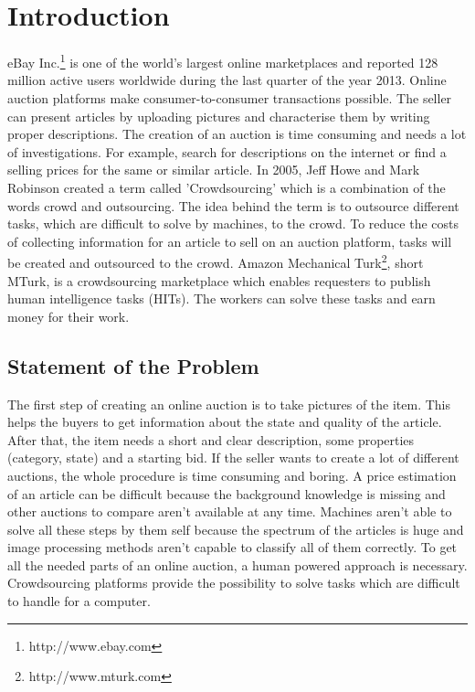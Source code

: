 \documentclass[a4paper]{report}
\begin{document}
  




%

\pagestyle{plain}
\newpage





\dominitoc
\tableofcontents
\newpage

\listoffigures

\listoftables

\lstlistoflistings

\chapter{Introduction}
\newpage
eBay Inc.\footnote{http://www.ebay.com} is one of the world's largest online marketplaces and reported 128 million active users worldwide during the last quarter of the year 2013. Online auction platforms make consumer-to-consumer transactions possible. The seller can present articles by uploading pictures and characterise them by writing proper descriptions. The creation of an auction is time consuming and needs a lot of investigations. For example, search for descriptions on the internet or find a selling prices for the same or similar article. In 2005, Jeff Howe and Mark Robinson created a term called 'Crowdsourcing' which is a combination of the words crowd and outsourcing. The idea behind the term is to outsource different tasks, which are difficult to solve by machines, to the crowd. To reduce the costs of collecting information for an article to sell on an auction platform, tasks will be created and outsourced to the crowd. Amazon Mechanical Turk\footnote{http://www.mturk.com}, short MTurk, is a crowdsourcing marketplace which enables requesters to publish human intelligence tasks (HITs). The workers can solve these tasks and earn money for their work.

\section{Statement of the Problem}
The first step of creating an online auction is to take pictures of the item. This helps the buyers to get information about the state and quality of the article. After that, the item needs a short and clear description, some properties (category, state) and a starting bid. If the seller wants to create a lot of different auctions, the whole procedure is time consuming and boring. A price estimation of an article can be difficult because the background knowledge is missing and other auctions to compare aren't available at any time. Machines aren't able to solve all these steps by them self because the spectrum of the articles is huge and image processing methods aren't capable to classify all of them correctly. To get all the needed parts of an online auction, a human powered approach is necessary. Crowdsourcing platforms provide the possibility to solve tasks which are difficult to handle for a computer.
\end{document}
